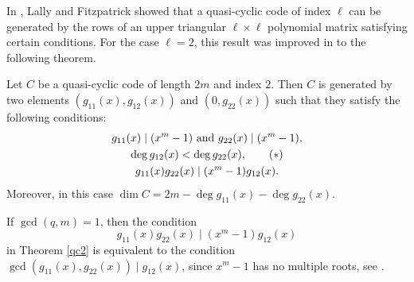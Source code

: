 \documentclass[a4paper,12pt]{article}
\begin{document}
In \cite{lally2001}, Lally and Fitzpatrick showed that a quasi-cyclic code of index $\ell$ can be generated by the rows of an upper triangular $\ell \times \ell$  polynomial matrix satisfying certain conditions. For the case $\ell=2$, this result was improved in    \cite[Theorem 3.1]{quasi2} to the  following theorem.
\begin{theorem} \label{qc2}
Let $C$ be a quasi-cyclic code of length $2m$ and index $2.$ 
Then $C$ is generated by two elements $(g_{11}(x), g_{12}(x))$ and $(0, g_{22}(x))$ such that they satisfy the following conditions: 
\begin{gather}  
g_{11}(x) \mid (x^m-1) \text{ and } g_{22}(x) \mid(x^m-1), \notag \\
\deg g_{12}(x) < \deg g_{22}(x), \tag{$\ast$}\\
g_{11}(x)g_{22}(x) \mid (x^m-1)g_{12}(x). \notag
\end{gather}
 Moreover, in this case $\dim C = 2m-\deg g_{11}(x)-\deg g_{22}(x)$.
\end{theorem}

\begin{remark} \label{remarkgcd}   If $\gcd(q,m)=1$, then the condition 
$$g_{11}(x)g_{22}(x) \mid (x^m-1)g_{12}(x)$$ 
in Theorem \ref{qc2} is equivalent to the condition $\gcd(g_{11}(x),g_{22}(x)) \mid g_{12}(x)$, since $x^m-1$ has no multiple roots, see  \cite[Remark 3.1]{quasi2}.
\end{remark}








\end{document}
